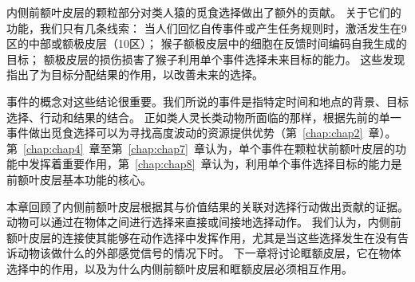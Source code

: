 内侧前额叶皮层的颗粒部分对类人猿的觅食选择做出了额外的贡献。
关于它们的功能，我们只有几条线索：
当人们回忆自传事件或产生任务规则时，激活发生在9区的中部或额极皮层（10区）；
猴子额极皮层中的细胞在反馈时间编码自我生成的目标；
额极皮层的损伤损害了猴子利用单个事件选择未来目标的能力。
这些发现指出了为目标分配结果的作用，以改善未来的选择\cite{tsujimoto2011frontal}。\par
事件的概念对这些结论很重要。我们所说的事件是指特定时间和地点的背景、目标选择、行动和结果的结合。
正如类人灵长类动物所面临的那样，根据先前的单一事件做出觅食选择可以为寻找高度波动的资源提供优势（第~\ref{chap:chap2}~章）。
第~\ref{chap:chap4}~章至第~\ref{chap:chap7}~章认为，单个事件在颗粒状前额叶皮层的功能中发挥着重要作用，第~\ref{chap:chap8}~章认为，利用单个事件选择目标的能力是前额叶皮层基本功能的核心。\par
本章回顾了内侧前额叶皮层根据其与价值结果的关联对选择行动做出贡献的证据。
动物可以通过在物体之间进行选择来直接或间接地选择动作。
我们认为，内侧前额叶皮层的连接使其能够在动作选择中发挥作用，尤其是当这些选择发生在没有告诉动物该做什么的外部感觉信号的情况下时。
下一章将讨论眶额皮层，它在物体选择中的作用，以及为什么内侧前额叶皮层和眶额皮层必须相互作用。\par

